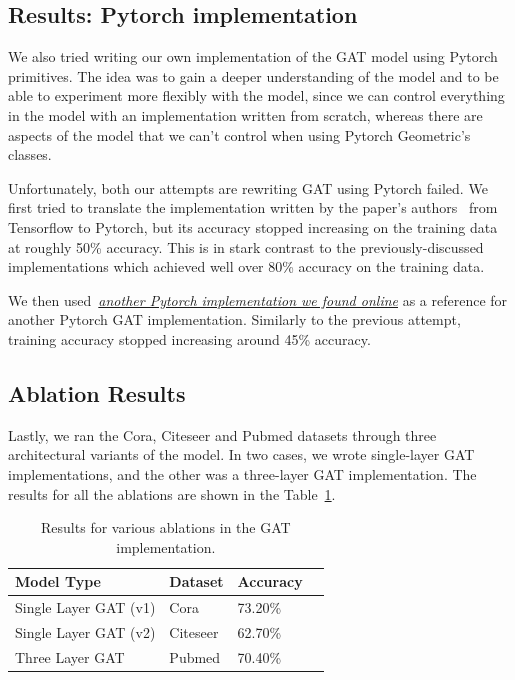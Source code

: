 \subsection{Results: Pytorch implementation}\label{subsec:results:-pytorch-implementation}
We also tried writing our own implementation of the GAT model using Pytorch
primitives. The idea was to gain a deeper understanding of the model and to be
able to experiment more flexibly with the model, since we can control
everything in the model with an implementation written from scratch, whereas
there are aspects of the model that we can't control when using Pytorch
Geometric's classes.

Unfortunately, both our attempts are rewriting GAT using Pytorch failed. We
first tried to translate the implementation written by the paper's authors~\cite{petarvgatgithub} from Tensorflow to Pytorch, but its
accuracy stopped increasing on the training data at roughly 50\% accuracy. This
is in stark contrast to the previously-discussed implementations which achieved
well over 80\% accuracy on the training data.

We then used~\href{https://github.com/gordicaleksa/pytorch-GAT/blob/main/models/definitions/GAT
.py#L349}{\textit{another Pytorch implementation we found online}} as a reference for another Pytorch
GAT implementation.
Similarly to the previous attempt, training accuracy stopped increasing around 45\% accuracy.

\subsection{Ablation Results}\label{subsec:ablation-results}
Lastly, we ran the Cora, Citeseer and Pubmed datasets through three
architectural variants of the model. In two cases, we wrote single-layer
GAT implementations, and the other was a three-layer GAT implementation.
The results for all the ablations are shown in the Table~\ref{tab:ablation-results}.
\begin{table}
    \centering
    \begin{tabular}{@{}llll@{}}
        \toprule
        \textbf{Model Type}     & \textbf{Dataset}   & \textbf{Accuracy}\\
        \midrule
        Single Layer GAT (v1)   &  {Cora}            &  {73.20}\%    \\
        Single Layer GAT (v2)   &  {Citeseer}        &  {62.70}\%    \\
        Three Layer GAT         &  {Pubmed}          &  {70.40}\%    \\
        \bottomrule

    \end{tabular}
    \caption{Results for various ablations in the GAT implementation.}
    \label{tab:ablation-results}
\end{table}
